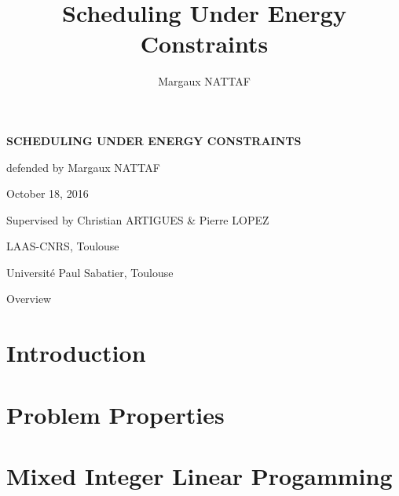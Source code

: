 \documentclass{beamer}
\title{Scheduling Under Energy Constraints}
\author{Margaux NATTAF}
\institute{LAAS-CNRS Toulouse

  Université Paul Sabatier Toulouse}
\begin{document}
{\canvasspecial
  \begin{frame}
    \vspace{1.5cm}
    \begin{flushleft}
      {\Large \bf \color{bleuLAAS}SCHEDULING UNDER ENERGY CONSTRAINTS}
      
      \vspace{0.3cm}
      \small \color{bleuLAAS!90} defended by Margaux NATTAF

      October 18, 2016
    \end{flushleft}
    \vspace{0.5cm}

    {\footnotesize  \color{bleuLAAS!80}
      Supervised by Christian ARTIGUES \& Pierre LOPEZ}

    \vspace{1.5cm}
    \begin{flushright} \color{bleuLAAS!70}
      \scriptsize LAAS-CNRS, Toulouse

      Université Paul Sabatier, Toulouse
    \end{flushright}
  \end{frame}}

\setcounter{framenumber}{0}


\setcounter{tocdepth}{1}
\begin{frame}{Overview}
  \tableofcontents[hideothersubsections,subsubsectionstyle={show/show/show/show}]
\end{frame}

\section{Introduction}



\setcounter{tocdepth}{2}
\section{Problem Properties}



\section{Mixed Integer Linear Progamming}

\end{document}
